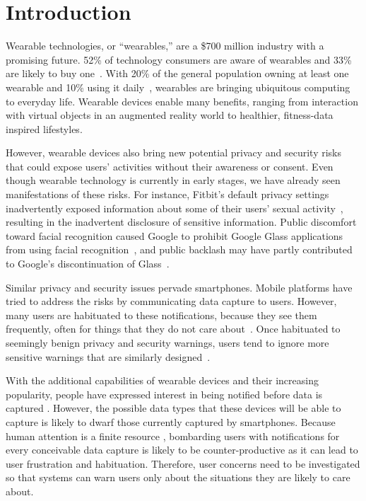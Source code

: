 
\section{Introduction}

Wearable technologies, or ``wearables,'' are a \$700 million industry \cite{cmo} with a promising future. 52\% of technology consumers are aware of wearables and 33\% are likely to buy one~\cite{NPD}. With 20\% of the general population owning at least one wearable and 10\% using it daily~\cite{WearableStatNews}, wearables are bringing ubiquitous computing to everyday life. Wearable devices enable many benefits, ranging from interaction with virtual objects in an augmented reality world to healthier, fitness-data inspired lifestyles. 

However, wearable devices also bring new potential privacy and security risks that could expose users' activities without their awareness or consent. Even though wearable technology is currently in early stages, we have already seen manifestations of these risks. For instance, Fitbit's default privacy settings inadvertently exposed information about some of their users' sexual activity~\cite{Fitbit}, resulting in the inadvertent disclosure of sensitive information. Public discomfort toward facial recognition caused Google to prohibit Google Glass applications from using facial recognition~\cite{GlassDetection}, and public backlash may have partly contributed to Google's discontinuation of Glass~\cite{1_russell_2014, 16_gross_2014}.

Similar privacy and security issues pervade smartphones. Mobile platforms have tried to address the risks by communicating data capture to users. However, many users are habituated to these notifications, because they see them frequently, often for things that they do not care about~\cite{felt2012android}. Once habituated to seemingly benign privacy and security warnings, users tend to ignore more sensitive warnings that are similarly designed~\cite{Egelman08}.

With the additional capabilities of wearable devices and their increasing popularity, people have expressed interest in being notified before data is captured \cite{denning2014situ}. However, the possible data types that these devices will be able to capture is likely to dwarf those currently captured by smartphones. Because human attention is a finite resource \cite{bohme2011security}, bombarding users with notifications for every conceivable data capture is likely to be counter-productive as it can lead to user frustration and habituation. Therefore, user concerns need to be investigated so that systems can warn users only about the situations they are likely to care about.


